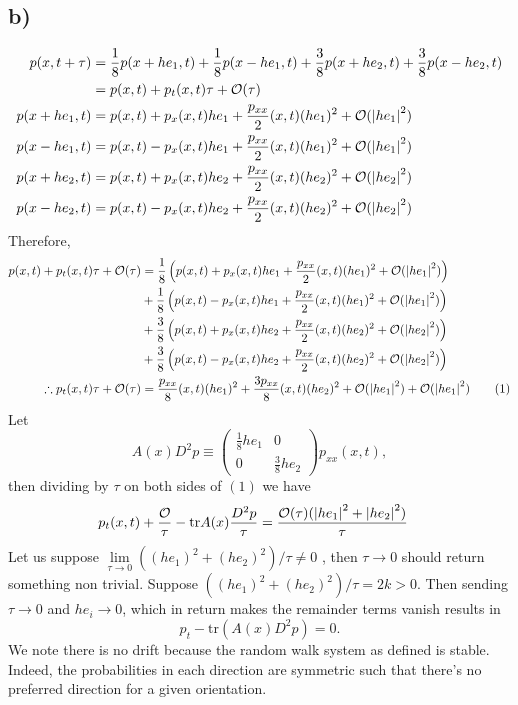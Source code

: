 \documentclass[
	12pt,
	]{article}
\theoremstyle{definition}
\theoremstyle{definition}
\theoremstyle{definition}
\theoremstyle{definition}
\theoremstyle{definition}
\theoremstyle{example}
\theoremstyle{note}
\theoremstyle{remark}
\theoremstyle{example}
\begin{document}
			\subsection*{b) }	
			\begin{align*}
			p(x,t+\tau) &= \frac18 p(x+he_{1} , t) +\frac18 p(x-he_{1} , t) +\frac38 p(x+he_{2} , t)  +\frac38 p(x-he_{2} , t) \\
			&= p(x,t) + p_{t}(x,t) \tau + \mathcal{O}(\tau) \\
			p(x+he_{1} ,t) &= p(x,t) + p_{x} (x,t) he_{1} +\frac{p_{xx}}{2} (x,t) (he_{1})^{2} + \mathcal{O}(\abs{he_{1}}^{2}) \\ 
			p(x-he_{1} ,t) &= p(x,t) - p_{x} (x,t) he_{1} +\frac{p_{xx}}{2} (x,t) (he_{1})^{2} +\mathcal{O}(\abs{he_{1}}^{2})  \\ 
			p(x+he_{2} ,t) &= p(x,t) + p_{x} (x,t) he_{2} +\frac{p_{xx}}{2} (x,t) (he_{2})^{2}+\mathcal{O}(\abs{he_{2}}^{2})  \\ 
			p(x-he_{2} ,t) &= p(x,t) - p_{x} (x,t) he_{2} +\frac{p_{xx}}{2} (x,t) (he_{2})^{2} +\mathcal{O}(\abs{he_{2}}^{2}) 
			\end{align*}
			Therefore, 
			\begin{align*}
			p(x,t) + p_{t}(x,t) \tau + \mathcal{O}(\tau) &= \frac18 \left(p(x,t) + p_{x} (x,t) he_{1} +\frac{p_{xx}}{2} (x,t) (he_{1})^{2} +\mathcal{O}(\abs{he_{1}}^{2}) \right) \\ 
			&+ \frac18 \left(p(x,t) - p_{x} (x,t) he_{1} +\frac{p_{xx}}{2} (x,t) (he_{1})^{2} +\mathcal{O}(\abs{he_{1}}^{2}) \right) \\
			&+ \frac38\left(p(x,t) + p_{x} (x,t) he_{2} +\frac{p_{xx}}{2} (x,t) (he_{2})^{2}+\mathcal{O}(\abs{he_{2}}^{2}) \right) \\
			&+ \frac38\left(p(x,t) - p_{x} (x,t) he_{2} +\frac{p_{xx}}{2} (x,t) (he_{2})^{2}+\mathcal{O}(\abs{he_{2}}^{2}) \right) \\
			\therefore p_{t}(x,t) \tau + \mathcal{O} (\tau) &= \frac{p_{xx}}{8} (x,t) (he_{1})^{2} + \frac{3 p_{xx}}{8} (x,t) (he_{2})^{2} + \mathcal{O}(\abs{he_{1}}^{2}) + \mathcal{O}(\abs{he_{1}}^{2}) \tag{1}
			\end{align*}
			Let 
			$$ A(x)D^{2}p \equiv  \begin{pmatrix}
				\frac{1}{8} he_{1} & 0 \\ 0 & \frac{3}{8} he_{2}
			\end{pmatrix} p_{xx}(x,t),$$
			then dividing by $\tau$ on both sides of $(1)$ we have 
			\begin{align*}
				p_{t}(x,t) + \frac{\mathcal{O}}{\tau} - \text{tr}A(x)\frac{D^{2}p}{\tau}  &= \frac{\mathcal{O(\tau)}(\abs{he_{1}}^{2} + \abs{he_{2}}^{2})}{\tau} 
			\end{align*}
				Let us suppose $\lim\limits_{\tau \to 0} ((he_{1})^{2} + (he_{2})^{2}) /\tau \neq 0$ , then $\tau \to 0$ should return something non trivial. Suppose $((he_{1})^{2} + (he_{2})^{2}) /\tau = 2k > 0$. Then sending $\tau \to 0$ and $he_{i} \to 0$, which in return makes the remainder terms vanish results in 
				$$ p_{t} - \text{tr}(A(x)D^{2}p) = 0.$$
				We note there is no drift because the random walk system as defined is stable. Indeed, the probabilities in each direction are symmetric such that there's no preferred direction for a given orientation. 
	
\end{document}
